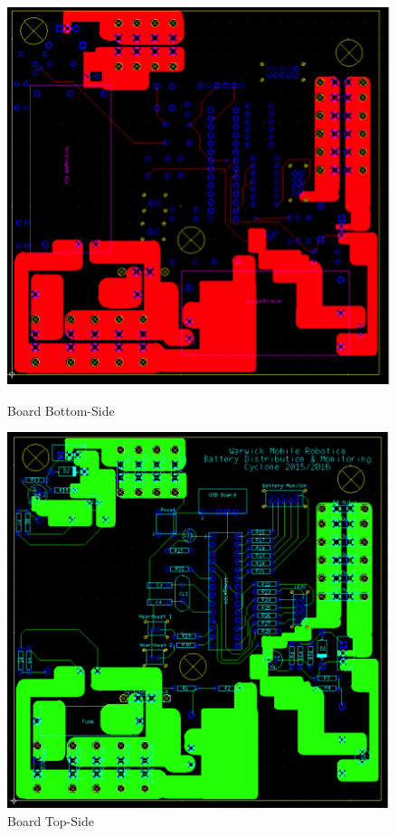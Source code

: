 \begin{figure}[ht]
  \centering
  \begin{minipage}[b]{0.45\textwidth}
    \includegraphics[width=\textwidth]{Images/ElectronicsFigures/BattMonBottom.png}
    \caption{Board Bottom-Side}
  \end{minipage}
  \hfill
  \begin{minipage}[b]{0.45\textwidth}
    \includegraphics[width=\textwidth]{Images/ElectronicsFigures/BattMonTop.png}
    \caption{Board Top-Side}
  \end{minipage}
\end{figure}



